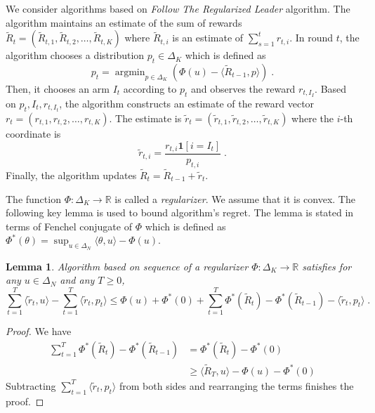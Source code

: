 \documentclass[12pt]{article}
\newtheorem{lemma}{Lemma}
\newcommand{\R}{\mathbb{R}}
\newcommand{\indicator}{\mathbf{1}}
\DeclareMathOperator{\argmin}{argmin}
\begin{document}
We consider algorithms based on \emph{Follow The Regularized Leader} algorithm.
The algorithm maintains an estimate of the sum of rewards $\widetilde R_t =
(\widetilde R_{t,1}, \widetilde R_{t,2}, \dots, \widetilde R_{t,K})$ where $\widetilde R_{t,i}$
is an estimate of $\sum_{s=1}^t r_{t,i}$.
In round $t$, the algorithm chooses a distribution $p_t \in \Delta_K$ which
is defined as
$$
p_t = \argmin_{p \in \Delta_K} \left( \Phi(u) - \langle \widetilde R_{t-1}, p \rangle \right) \; .
$$
Then, it chooses an arm $I_t$ according to $p_t$ and observes the reward $r_{t,I_I}$.
Based on $p_t, I_t, r_{t,I_t}$, the algorithm constructs an estimate of the reward vector $r_t = (r_{t,1}, r_{t,2}, \dots, r_{t,K})$.
The estimate is $\widetilde r_t = (\widetilde r_{t,1}, \widetilde r_{t,2}, \dots, \widetilde r_{t,K})$
where the $i$-th coordinate is
$$
\widetilde r_{t,i} = \frac{r_{t,i} \indicator[i=I_t]}{p_{t,i}}  \; .
$$
Finally, the algorithm updates $\widetilde R_t = \widetilde R_{t-1} + \widetilde r_t$.

The function $\Phi:\Delta_K \to \R$ is called a \emph{regularizer}. We assume
that it is convex.  The following key lemma is used to bound algorithm's
regret. The lemma is stated in terms of Fenchel conjugate of $\Phi$ which is
defined as $\Phi^*(\theta) = \sup_{u \in \Delta_N} \langle \theta, u \rangle -
\Phi(u)$.

\begin{lemma}
\label{lemma:ftrl-regret}
Algorithm based on sequence of a regularizer $\Phi:\Delta_K \to \R$ satisfies
for any $u \in \Delta_N$ and any $T \ge 0$,
\begin{equation}
\label{equation:ftrl-regret}
\sum_{t=1}^T \langle \widetilde r_t, u \rangle - \sum_{t=1}^T \langle \widetilde r_t, p_t \rangle
\le \Phi(u) + \Phi^*(0) + \sum_{t=1}^T \Phi^*\left(\widetilde R_t\right) - \Phi^*\left(\widetilde R_{t-1}\right) - \langle \widetilde r_t, p_t \rangle \; .
\end{equation}
\end{lemma}

\begin{proof}
We have
\begin{align*}
\sum_{t=1}^T \Phi^*\left(\widetilde R_t\right) - \Phi^*\left(\widetilde R_{t-1}\right)
& = \Phi^*\left(\widetilde R_t \right) - \Phi^*(0) \\
& \ge \langle \widetilde R_T, u \rangle -  \Phi(u) - \Phi^*(0)
\end{align*}
Subtracting $\sum_{t=1}^T \langle \widetilde r_t, p_t \rangle$ from both sides
and rearranging the terms finishes the proof.
\end{proof}
\end{document}
